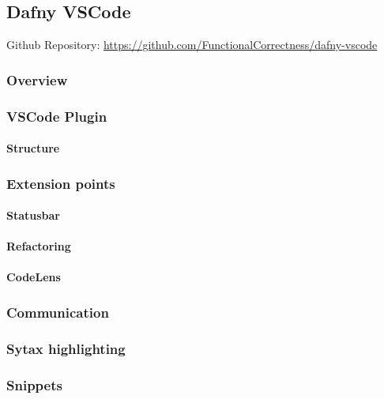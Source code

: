 \subsection{Dafny VSCode}
Github Repository: \href{https://github.com/FunctionalCorrectness/dafny-vscode}{https://github.com/FunctionalCorrectness/dafny-vscode}

\subsubsection{Overview}

\subsubsection{VSCode Plugin}
\paragraph{Structure}

\subsubsection{Extension points}

\paragraph{Statusbar}
\paragraph{Refactoring}
\paragraph{CodeLens}


\subsubsection{Communication}

\subsubsection{Sytax highlighting}

\subsubsection{Snippets}

